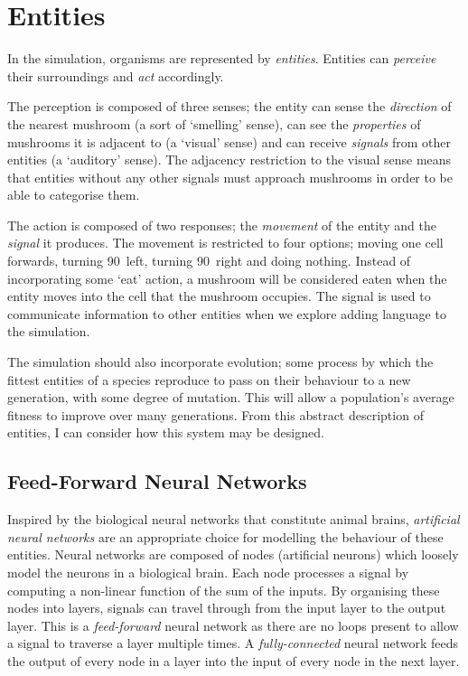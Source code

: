 \documentclass[12pt,a4paper,twoside,openright]{report}
\begin{document}
\section{Entities}\label{section:entities}

In the simulation, organisms are represented by \emph{entities}. Entities can \emph{perceive} their surroundings and \emph{act} accordingly.

The perception is composed of three senses; the entity can sense the \emph{direction} of the nearest mushroom (a sort of `smelling' sense), can see the \emph{properties} of mushrooms it is adjacent to (a `visual' sense) and can receive \emph{signals} from other entities (a `auditory' sense). The adjacency restriction to the visual sense means that entities without any other signals must approach mushrooms in order to be able to categorise them.

The action is composed of two responses; the \emph{movement} of the entity and the \emph{signal} it produces. The movement is restricted to four options; moving one cell forwards, turning 90\textdegree~left, turning 90\textdegree~right and doing nothing. Instead of incorporating some `eat' action, a mushroom will be considered eaten when the entity moves into the cell that the mushroom occupies. The signal is used to communicate information to other entities when we explore adding language to the simulation.

The simulation should also incorporate evolution; some process by which the fittest entities of a species reproduce to pass on their behaviour to a new generation, with some degree of mutation. This will allow a population's average fitness to improve over many generations. From this abstract description of entities, I can consider how this system may be designed.

\subsection{Feed-Forward Neural Networks}\label{section:neural}

Inspired by the biological neural networks that constitute animal brains, \emph{artificial neural networks} are an appropriate choice for modelling the behaviour of these entities. Neural networks are composed of nodes (artificial neurons) which loosely model the neurons in a biological brain. Each node processes a signal by computing a non-linear function of the sum of the inputs. By organising these nodes into layers, signals can travel through from the input layer to the output layer. This is a \emph{feed-forward} neural network as there are no loops present to allow a signal to traverse a layer multiple times. A \emph{fully-connected} neural network feeds the output of every node in a layer into the input of every node in the next layer. 
\end{document}
